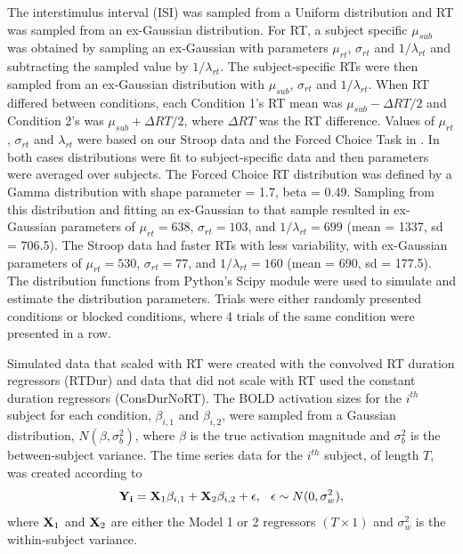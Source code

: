 \documentclass[titlepage,12pt] {article}
\begin{document}
The interstimulus interval (ISI) was sampled from a Uniform distribution and RT was sampled from an ex-Gaussian distribution.  For RT, a subject specific $\mu_{sub}$ was obtained by sampling an ex-Gaussian with parameters $\mu_{rt}$, $\sigma_{rt}$ and $1/\lambda_{rt}$ and subtracting the sampled value by $1/\lambda_{rt}$.  The subject-specific RTs were then sampled from an ex-Gaussian distribution with $\mu_{sub}$, $\sigma_{rt}$ and $1/\lambda_{rt}$.  
When RT differed between conditions, each Condition 1's RT mean was $\mu_{sub} - \Delta RT/2$ and Condition 2's was $\mu_{sub}+\Delta RT/2$, where $\Delta RT$ was the RT difference.  Values of $\mu_{rt}$, $\sigma_{rt}$ and $\lambda_{rt}$ were based on our Stroop data and the Forced Choice Task in \citet{grinband_detection_2008}.  In both cases distributions were fit to subject-specific data and then parameters were averaged over subjects.  The Forced Choice RT distribution was defined by a Gamma distribution with shape parameter = 1.7, beta = 0.49.  Sampling from this distribution and fitting an ex-Gaussian to that sample resulted in ex-Gaussian parameters of $\mu_{rt} = 638$, $\sigma_{rt} = 103$, and $1/\lambda_{rt} = 699$ (mean = 1337, sd = 706.5). The Stroop data had faster RTs with less variability, with ex-Gaussian parameters of  $\mu_{rt} =530$, $\sigma_{rt} = 77$, and $1/\lambda_{rt} = 160$ (mean = 690, sd = 177.5).  The distribution functions from Python's Scipy module were used to simulate and estimate the distribution parameters. Trials were either randomly presented conditions or blocked conditions, where 4 trials of the same condition were presented in a row.
 


Simulated data that scaled with RT were created with the convolved RT duration regressors (RTDur) and data that did not scale with RT used the constant duration regressors (ConsDurNoRT).  The BOLD activation sizes for the $i^{th}$ subject for each condition, $\beta_{i, 1}$ and $\beta_{i,2}$, were  sampled from a Gaussian distribution, $N(\beta, \sigma_b^2)$,  where $\beta$ is the true activation magnitude and $\sigma^2_b$ is the between-subject variance.  The time series data for the $i^{th}$ subject, of length $T$, was created according to 
\begin{equation} \label{eq:timeseries}
   \vb{Y_i} = \vb{X}_{1}\beta_{i, 1}  +  \vb{X}_{2}\beta_{i, 2} + \epsilon, \hspace{.1in} \epsilon \sim N(0, \sigma^2_w), 
\end{equation}
where $\vb{X}_{1}$ and $\vb{X}_{2}$  are either the Model 1 or 2 regressors $(T\times 1)$  and $\sigma^2_w$ is the within-subject variance.  
\end{document}
